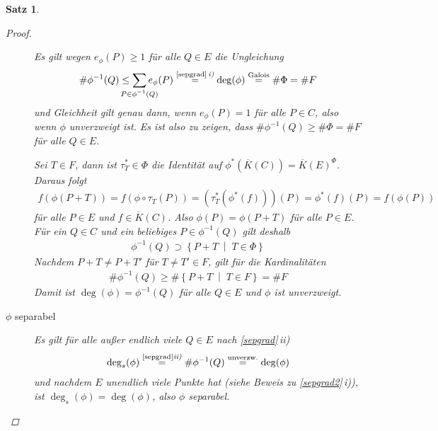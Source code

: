 \documentclass[english, german, parskip=half]{scrartcl}
\newtheorem{Satz}{Satz}[section]
\theoremstyle{definition}
\theoremstyle{remark}
\newcommand*{\algK}{\ensuremath{\overline K}} %
\newcommand*{\degs}{\operatorname{\deg}_s} %
\newcommand{\F}{F} %
\begin{document}
\begin{Satz}
\begin{proof}
\begin{description}
      Es gilt wegen $e_\phi(P)\geq1$ für alle $Q\in E$ die Ungleichung
      \begin{gather*}
        \#\phi^{-1}(Q)
        \leq
        \sum_{\mathclap{P\in\phi^{-1}(Q)}} e_\phi(P)
        \overset{\text{\autoref{sepgrad}\,\emph{i)}}}{=}
        \deg(\phi)
        \overset{\text{Galois}}{=}
        \#\Phi
        =\# \F
      \end{gather*}
      und Gleichheit gilt genau dann, wenn $e_\phi(P)=1$ für alle
      $P\in C$, also wenn $\phi$ unverzweigt ist.
      Es ist also zu zeigen, dass $\#\phi^{-1}(Q)\geq\#\Phi=\# \F$ für alle 
      $Q\in E$.

      Sei $T\in\F$, dann ist $\tau_T^*\in\Phi$ die Identität auf
      $\phi^*(\algK(C))=\algK(E)^\Phi$. Daraus folgt
      \begin{gather*}
        f(\phi(P+T))
        = f(\phi\circ\tau_T(P)) 
        = \left( \tau_T^*(\phi^*(f)) \right)(P)
        = \phi^*(f)(P)
        = f(\phi(P))
      \end{gather*}
      für alle $P\in E$ und $f\in\algK(C)$.
      Also $\phi(P) = \phi(P+T)$ für alle $P\in E$.
      Für ein $Q\in C$ und ein beliebiges $P\in\phi^{-1}(Q)$ gilt
      deshalb
      \begin{gather*}
        \phi^{-1}(Q) 
        \supset \left\{ P+T \;\middle|\; T\in\Phi \right\}        
      \end{gather*}
      Nachdem $P+T\neq P+T'$ für $T\neq T'\in\F$, gilt für die
      Kardinalitäten
      \begin{gather*}
        \#\phi^{-1}(Q) 
        \geq \#\left\{ P+T \;\middle|\; T\in F \right\}
        = \#\F
      \end{gather*}
      Damit ist $\deg(\phi)=\phi^{-1}(Q)$ für alle $Q\in E$ und
      $\phi$ ist unverzweigt.

    \item[$\phi$ separabel]
      Es gilt für alle außer endlich viele $Q\in E$ nach
      \autoref{sepgrad}\,\emph{ii)}
      \begin{gather*}
        \degs(\phi) 
        \overset{\text{\autoref{sepgrad}\emph{ii)}}}{=}
        \#\phi^{-1}(Q) 
        \overset{\text{unverzw.}}{=} 
          \deg(\phi)
      \end{gather*}
      und nachdem $E$ unendlich viele Punkte hat (siehe Beweis zu
      \autoref{sepgrad2}\,\emph{i)}), ist $\degs(\phi)=\deg(\phi)$, also
      $\phi$ separabel.
  

\end{description}
\end{proof}
\end{Satz}
\end{document}
